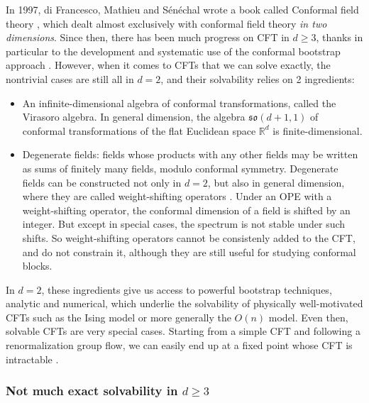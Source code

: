 \documentclass[12pt, a4paper]{article}
\begin{document}
In 1997, di Francesco, Mathieu and Sénéchal wrote a book called Conformal field theory \cite{fms97}, which dealt almost exclusively with conformal field theory \textit{in two dimensions}. Since then, there has been much progress on CFT in $d\geq 3$, thanks in particular to the development and systematic use of the conformal bootstrap approach \cite{prv18}. However, when it comes to CFTs that we can solve exactly, the nontrivial cases are still all in $d=2$, and their solvability relies on 2 ingredients:
\begin{itemize}
 \item An infinite-dimensional algebra of conformal transformations, called the Virasoro algebra. In general dimension, the algebra $\mathfrak{so}(d+1,1)$ of conformal transformations of the flat Euclidean space $\mathbb{R}^d$ is finite-dimensional. 
 \item Degenerate fields: fields whose products with any other fields may be written as sums of finitely many fields, modulo conformal symmetry. Degenerate fields can be constructed not only in $d=2$, but also in general dimension, where they are called weight-shifting operators \cite{kks17}. Under an OPE with a weight-shifting operator, the conformal dimension of a field is shifted by an integer. But except in special cases, the spectrum is not stable under such shifts. So weight-shifting operators cannot be consistenly added to the CFT, and do not constrain it, although they are still useful for studying conformal blocks. 
\end{itemize}
In $d=2$, these ingredients give us access to powerful bootstrap techniques, analytic and numerical, which underlie the solvability of physically well-motivated CFTs such as the Ising model or more generally the $O(n)$ model.
Even then, solvable CFTs are very special cases. Starting from a simple CFT and following a renormalization group flow, we can easily end up at a fixed point whose CFT is intractable \cite{ab24}.


\subsubsection*{Not much exact solvability in $d\geq 3$}
\end{document}
